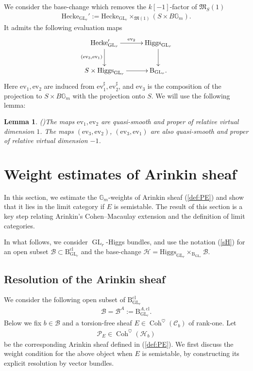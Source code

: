 \documentclass[11pt,oneside,a4paper,mathscr]{amsart}
\newtheorem{lemma}[thm]{Lemma}
\theoremstyle{definition}
\newcommand{\cH}{\mathcal{H}}
\newcommand{\cB}{\mathcal{B}}
\newcommand{\cC}{\mathcal{C}}
\newcommand{\cP}{\mathcal{P}}
\newcommand{\ev}{\mathrm{ev}}
\newcommand{\bgm}{B\mathbb{G}_m}
\newcommand{\rB}{\mathrm{B}}
\newcommand{\Coh}{\operatorname{Coh}}
\newcommand{\GL}{\operatorname{GL}}
\newcommand{\Hig}{\mathrm{Higgs}}
\begin{document}
We consider the base-change which removes the $k[-1]$-factor of $\mathfrak{M}_S(1)$
\begin{align*}
\mathrm{Hecke}_{\GL_r}':=\mathrm{Hecke}_{\mathrm{GL}_r}\times_{\mathfrak{M}(1)}(S\times \bgm). 
\end{align*}
It admits the following evaluation maps 
\begin{align}\label{dia:hecke'}
    \xymatrix{
\mathrm{Hecke}_{\GL_r}' \ar[r]^-{\ev_2} \ar[d]_{(\ev_3, \ev_1)} & 
\Hig_{\GL_r} \ar[d] \\
S\times \Hig_{\GL_r} \ar[r] & \rB_{\GL_r}.
    }
\end{align}
Here $\ev_1, \ev_2$ are induced from $\ev_1^{\sharp}, \ev_2^{\sharp}$, and $\ev_3$ is the composition of the projection to $S\times \bgm$ with the projection onto $S$. We will use the following lemma: 
\begin{lemma}\emph{(\cite[Lemma~3.1]{TodaGL2})}\label{lem:qsmooth}
    The maps $\ev_1, \ev_2$ are quasi-smooth and proper of relative virtual dimension $1$. The maps $(\ev_3, \ev_2)$, $(\ev_3, \ev_1)$ are also quasi-smooth and proper of relative virtual dimension $-1$. 
\end{lemma}

\section{Weight estimates of Arinkin sheaf}
In this section, we estimate the $\mathbb{G}_m$-weights of Arinkin sheaf (\ref{def:PE})
and show that it lies in the limit category if $E$ is semistable. 
The result of this section is a key step relating Arinkin's Cohen--Macaulay extension 
and the definition of limit categories. 

In what follows, we consider $\GL_r$-Higgs bundles, and use the notation (\ref{sH}) for 
an open subset $\cB \subset \rB_{\GL_r}^{\mathrm{cl}}$ and the base-change 
$\cH=\Hig_{\GL_r}\times_{\rB_{\GL_r}} \cB$. 
\subsection{Resolution of the Arinkin sheaf}
We consider the following open subset of $\rB_{\GL_r}^{\mathrm{cl}}$
\begin{align*}
   \cB= \cB^{A} :=\rB_{\GL_r}^{A, \mathrm{cl}}.
\end{align*}
Below we fix $b\in \cB$ and a torsion-free sheaf $E\in \Coh^{\heartsuit}(\cC_b)$ of rank-one. Let
\begin{align*}
    \cP_E \in \Coh^{\heartsuit}(\cH_b)
\end{align*}
be the corresponding Arinkin sheaf defined in (\ref{def:PE}). We first discuss the weight condition 
for the above object when $E$ is semistable, by constructing its explicit resolution by vector bundles. 
\end{document}
